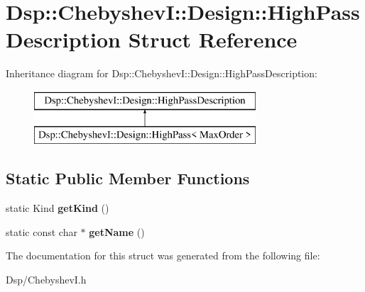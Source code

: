 \hypertarget{structDsp_1_1ChebyshevI_1_1Design_1_1HighPassDescription}{\section{Dsp\-:\-:Chebyshev\-I\-:\-:Design\-:\-:High\-Pass\-Description Struct Reference}
\label{structDsp_1_1ChebyshevI_1_1Design_1_1HighPassDescription}
}
Inheritance diagram for Dsp\-:\-:Chebyshev\-I\-:\-:Design\-:\-:High\-Pass\-Description\-:\begin{figure}[H]
\begin{center}
\leavevmode
\includegraphics[height=2.000000cm]{structDsp_1_1ChebyshevI_1_1Design_1_1HighPassDescription}
\end{center}
\end{figure}
\subsection*{Static Public Member Functions}
\begin{DoxyCompactItemize}
\item 
\hypertarget{structDsp_1_1ChebyshevI_1_1Design_1_1HighPassDescription_a9df1d552afc05f5a88b1ac0e7288e11d}{static Kind {\bfseries get\-Kind} ()}\label{structDsp_1_1ChebyshevI_1_1Design_1_1HighPassDescription_a9df1d552afc05f5a88b1ac0e7288e11d}

\item 
\hypertarget{structDsp_1_1ChebyshevI_1_1Design_1_1HighPassDescription_a6ace50b9b3630a96a0cff704fabab852}{static const char $\ast$ {\bfseries get\-Name} ()}\label{structDsp_1_1ChebyshevI_1_1Design_1_1HighPassDescription_a6ace50b9b3630a96a0cff704fabab852}

\end{DoxyCompactItemize}


The documentation for this struct was generated from the following file\-:\begin{DoxyCompactItemize}
\item 
Dsp/Chebyshev\-I.\-h\end{DoxyCompactItemize}
